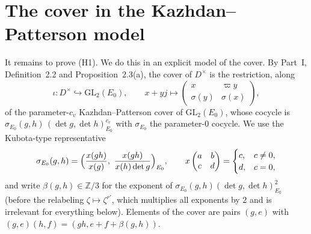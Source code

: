 \documentclass[11pt]{article}
\newcommand{\Z}{\mathbb Z}
\theoremstyle{plain}
\theoremstyle{definition}
\begin{document}
\section{The cover in the Kazhdan--Patterson model}\label{sec:model}
It remains to prove (H1).  We do this in an explicit model of the
cover.  By Part~I, Definition~2.2 and Proposition~2.3(a), the cover of
$D^\times$ is the restriction, along
\begin{equation}\label{eq:iota}
 \iota:D^\times\hookrightarrow\mathrm{GL}_2(E_0),\qquad
 x+yj\longmapsto\begin{pmatrix}x&\varpi y\\\sigma(y)&\sigma(x)\end{pmatrix},
\end{equation}
of the parameter-$c_v$ Kazhdan--Patterson cover of $\mathrm{GL}_2(E_0)$,
whose cocycle is $\sigma_{E_0}(g,h)\,(\det g,\det h)_{E_0}^{c_v}$ with
$\sigma_{E_0}$ the parameter-$0$ cocycle.  We use the Kubota-type
representative
\begin{equation}\label{eq:kubota}
 \sigma_{E_0}(g,h)=\Bigl(\frac{x(gh)}{x(g)},\ \frac{x(gh)}{x(h)\det g}\Bigr)_{E_0},
 \qquad x\begin{pmatrix}a&b\\c&d\end{pmatrix}=\begin{cases}c,&c\ne0,\\ d,&c=0,\end{cases}
\end{equation}
and write $\beta(g,h)\in\Z/3$ for the exponent of
$\sigma_{E_0}(g,h)(\det g,\det h)_{E_0}^{2}$ (before the relabeling
$\zeta\mapsto\zeta^{r'}$, which multiplies all exponents by $2$ and is
irrelevant for everything below).  Elements of the cover are pairs
$(g,e)$ with $(g,e)(h,f)=(gh,e+f+\beta(g,h))$.
\end{document}
